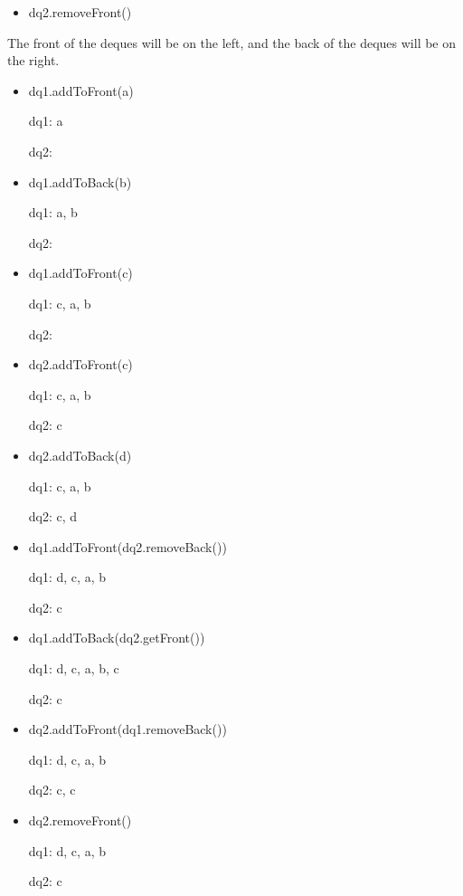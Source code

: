 \documentclass[10pt]{article}
\begin{document}
\begin{enumerate}
\begin{itemize}
				\item dq2.removeFront()
			\end{itemize}
			
			\vspace{0.5cm}
			The front of the deques will be on the left, and the back of the deques will be on the right.
			
			\begin{itemize}
				\item dq1.addToFront(a)
					
					dq1: a
					
					dq2:
				
				\item dq1.addToBack(b)
					
					dq1: a, b
					
					dq2:
				
				\item dq1.addToFront(c)
					
					dq1: c, a, b
					
					dq2:
				
				\item dq2.addToFront(c)
					
					dq1: c, a, b
					
					dq2: c
				
				\item dq2.addToBack(d)
					
					dq1: c, a, b
					
					dq2: c, d
				
				\item dq1.addToFront(dq2.removeBack())
					
					dq1: d, c, a, b
					
					dq2: c
				
				\item dq1.addToBack(dq2.getFront())
					
					dq1: d, c, a, b, c
					
					dq2: c
				
				\item dq2.addToFront(dq1.removeBack())
					
					dq1: d, c, a, b
					
					dq2: c, c
				
				\item dq2.removeFront()
					
					dq1: d, c, a, b
					
					dq2: c
			\end{itemize}
			\vspace{0.5cm}
		

\end{enumerate}
\end{document}
